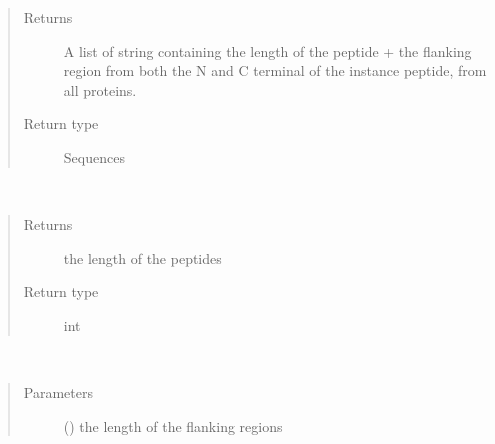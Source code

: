 \documentclass[letterpaper,10pt,english]{sphinxmanual}
\begin{document}
\begin{fulllineitems}
\begin{fulllineitems}
\begin{quote}
\begin{description}
\item[{Returns}] \leavevmode
A list of string containing the length of the peptide + the flanking region from               both the N and C terminal of the instance peptide, from all proteins.

\item[{Return type}] \leavevmode
Sequences

\end{description}\end{quote}

\end{fulllineitems}


\begin{fulllineitems}
\label{\detokenize{IPTK.Classes:IPTK.Classes.Peptide.Peptide.get_length}}~\begin{quote}\begin{description}
\item[{Returns}] \leavevmode
the length of the peptides

\item[{Return type}] \leavevmode
int

\end{description}\end{quote}

\end{fulllineitems}


\begin{fulllineitems}
\label{\detokenize{IPTK.Classes:IPTK.Classes.Peptide.Peptide.get_n_terminal_flank_seq}}~\begin{quote}\begin{description}
\item[{Parameters}] \leavevmode
{} () \textendash{} the length of the flanking regions


\end{description}
\end{quote}
\end{fulllineitems}
\end{fulllineitems}
\end{document}

